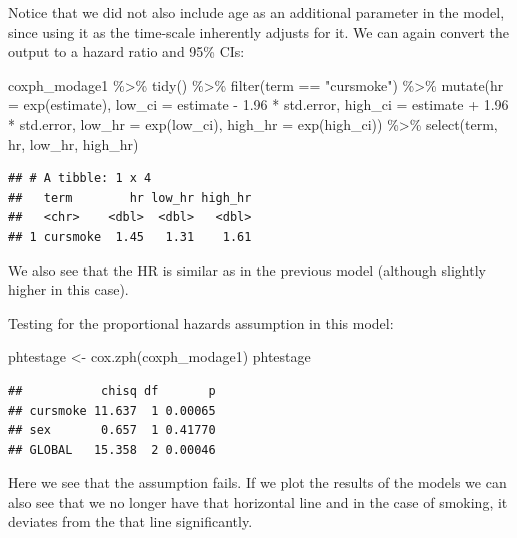 \documentclass[
]{book}
\newenvironment{Shaded}{\begin{snugshade}}{\end{snugshade}}
\newcommand{\AttributeTok}[1]{\textcolor[rgb]{0.77,0.63,0.00}{#1}}
\newcommand{\FloatTok}[1]{\textcolor[rgb]{0.00,0.00,0.81}{#1}}
\newcommand{\FunctionTok}[1]{\textcolor[rgb]{0.00,0.00,0.00}{#1}}
\newcommand{\NormalTok}[1]{#1}
\newcommand{\OtherTok}[1]{\textcolor[rgb]{0.56,0.35,0.01}{#1}}
\newcommand{\SpecialCharTok}[1]{\textcolor[rgb]{0.00,0.00,0.00}{#1}}
\newcommand{\StringTok}[1]{\textcolor[rgb]{0.31,0.60,0.02}{#1}}
\begin{document}
Notice that we did not also include age as an additional parameter in the model, since using it as the time-scale inherently adjusts for it. We can again convert the output to a hazard ratio and 95\% CIs:

\begin{Shaded}
\begin{Highlighting}[]
\NormalTok{coxph\_modage1 }\SpecialCharTok{\%\textgreater{}\%} 
  \FunctionTok{tidy}\NormalTok{() }\SpecialCharTok{\%\textgreater{}\%} 
  \FunctionTok{filter}\NormalTok{(term }\SpecialCharTok{==} \StringTok{"cursmoke"}\NormalTok{) }\SpecialCharTok{\%\textgreater{}\%} 
  \FunctionTok{mutate}\NormalTok{(}\AttributeTok{hr =} \FunctionTok{exp}\NormalTok{(estimate),}
         \AttributeTok{low\_ci =}\NormalTok{ estimate }\SpecialCharTok{{-}} \FloatTok{1.96} \SpecialCharTok{*}\NormalTok{ std.error, }
         \AttributeTok{high\_ci =}\NormalTok{ estimate }\SpecialCharTok{+} \FloatTok{1.96} \SpecialCharTok{*}\NormalTok{ std.error, }
         \AttributeTok{low\_hr =} \FunctionTok{exp}\NormalTok{(low\_ci), }
         \AttributeTok{high\_hr =} \FunctionTok{exp}\NormalTok{(high\_ci)) }\SpecialCharTok{\%\textgreater{}\%} 
  \FunctionTok{select}\NormalTok{(term, hr, low\_hr, high\_hr)}
\end{Highlighting}
\end{Shaded}

\begin{verbatim}
## # A tibble: 1 x 4
##   term        hr low_hr high_hr
##   <chr>    <dbl>  <dbl>   <dbl>
## 1 cursmoke  1.45   1.31    1.61
\end{verbatim}

We also see that the HR is similar as in the previous model (although slightly higher in this case).

Testing for the proportional hazards assumption in this model:

\begin{Shaded}
\begin{Highlighting}[]
\NormalTok{phtestage }\OtherTok{\textless{}{-}} \FunctionTok{cox.zph}\NormalTok{(coxph\_modage1)}
\NormalTok{phtestage}
\end{Highlighting}
\end{Shaded}

\begin{verbatim}
##           chisq df       p
## cursmoke 11.637  1 0.00065
## sex       0.657  1 0.41770
## GLOBAL   15.358  2 0.00046
\end{verbatim}

Here we see that the assumption fails. If we plot the results of the models we can also see that we no longer have that horizontal line and in the case of smoking, it deviates from the that line significantly.
\end{document}
